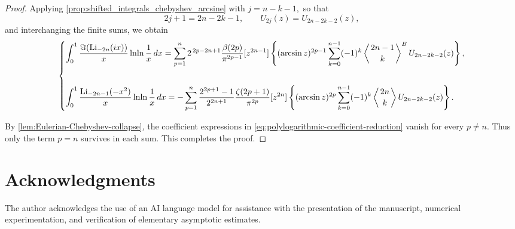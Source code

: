 \documentclass[11pt,twoside]{article}
\numberwithin{equation}{section}
\begin{document}
\begin{proof}
Applying
\cref{prop:shifted_integrals_chebyshev_arcsine}
with \(\displaystyle j=n-k-1,\)
so that
\[
2j+1=2n-2k-1,
\qquad
U_{2j}(z)=U_{2n-2k-2}(z),
\]
and interchanging the finite sums, we obtain
\begin{equation}\label{eq:polylogarithmic-coefficient-reduction}
\begin{dcases}
\displaystyle
\int_{0}^{1}
\frac{\Im\!\left(\operatorname{Li}_{-2n}(ix)\right)}{x}
\ln\!\ln\frac{1}{x}\,dx
=
\sum_{p=1}^{n}
2^{\,2p-2n+1}
\frac{\beta(2p)}{\pi^{2p-1}}
[z^{2n-1}]\left\{
(\arcsin z)^{2p-1}
\sum_{k=0}^{n-1}
(-1)^k
\left\langle {2n-1\atop k}\right\rangle^{B}
U_{2n-2k-2}(z)\right\},
\\[4ex]
\displaystyle
\int_{0}^{1}
\frac{\operatorname{Li}_{-2n-1}(-x^{2})}{x}
\ln\!\ln\frac{1}{x}\,dx
=
-\sum_{p=1}^{n}
\frac{2^{2p+1}-1}{2^{2n+1}}
\frac{\zeta(2p+1)}{\pi^{2p}}
[z^{2n}]\left\{
(\arcsin z)^{2p}
\sum_{k=0}^{n-1}
(-1)^k
\left\langle {2n\atop k}\right\rangle
U_{2n-2k-2}(z)\right\}.
\end{dcases}
\end{equation}

By \cref{lem:Eulerian-Chebyshev-collapse}, the coefficient
expressions in \cref{eq:polylogarithmic-coefficient-reduction}
vanish for every \(p\neq n\). Thus only the term \(p=n\) survives in each sum. This completes the proof.
\end{proof}

\section*{Acknowledgments}

The author acknowledges the use of an AI language model for assistance with the presentation of the manuscript, numerical experimentation, and verification of elementary asymptotic estimates.


\printbibliography
\end{document}
